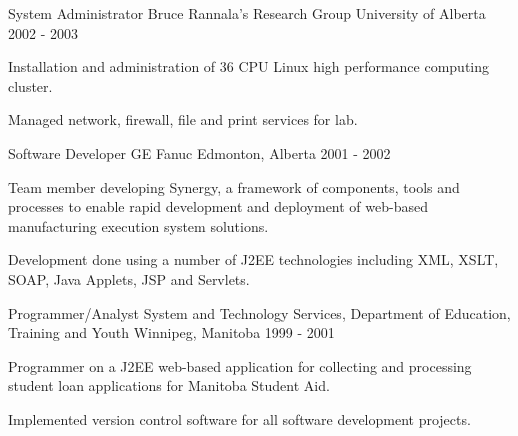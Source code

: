 \begin{cventries}
  \cventry
    {System Administrator} %
    {Bruce Rannala's Research Group} %
    {University of Alberta} %
    {2002 - 2003} %
    {
      \begin{cvitems} %
        \item {Installation and administration of 36 CPU Linux high performance computing cluster.}
        \item {Managed network, firewall, file and print services for lab.}
      \end{cvitems}
    }

  \cventry
    {Software Developer} %
    {GE Fanuc} %
    {Edmonton, Alberta} %
    {2001 - 2002} %
    {
      \begin{cvitems} %
        \item {Team member developing Synergy, a framework of components, tools and processes to enable rapid development and deployment of web-based manufacturing execution system solutions.}
        \item {Development done using a number of J2EE technologies including XML, XSLT, SOAP, Java Applets, JSP and Servlets.}
      \end{cvitems}
    }

  \cventry
    {Programmer/Analyst} %
    {System and Technology Services, Department of Education, Training and Youth} %
    {Winnipeg, Manitoba} %
    {1999 - 2001} %
    {
      \begin{cvitems} %
        \item {Programmer on a J2EE web-based application for collecting and processing student loan applications for Manitoba Student Aid.}
        \item {Implemented version control software for all software development projects.}
      \end{cvitems}
    }

\end{cventries}
